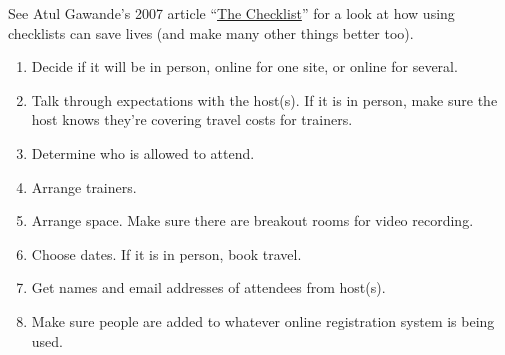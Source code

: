 
See Atul Gawande's 2007 article
``\href{http://www.newyorker.com/magazine/2007/12/10/the-checklist}{The Checklist}''
for a look at how using checklists can save lives (and make many other
things better too).


\begin{enumerate}

\item
  Decide if it will be in person, online for one site, or online for
  several.

\item
  Talk through expectations with the host(s).
  If it is in person, make sure the host knows they're covering
  travel costs for trainers.

\item
  Determine who is allowed to attend.

\item
  Arrange trainers.

\item
  Arrange space.
  Make sure there are breakout rooms for video recording.

\item
  Choose dates.
  If it is in person, book travel.

\item
  Get names and email addresses of attendees from host(s).

\item
  Make sure people are added to whatever online registration system is
  being used.

\end{enumerate}


